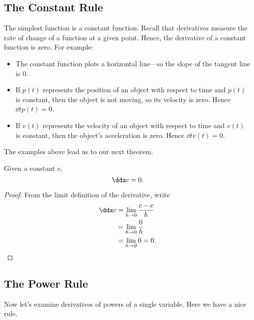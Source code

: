 \subsection*{The Constant Rule}

The simplest function is a constant function.  Recall that derivatives
measure the rate of change of a function at a given point. Hence, the
derivative of a constant function is zero. For example:
\begin{itemize}
\item The constant function plots a horizontal line---so the slope of
  the tangent line is $0$.
\item If $p(t)$ represents the position of an object with respect to
  time and $p(t)$ is constant, then the object is not moving, so its
  velocity is zero. Hence $\dd{t} p(t) = 0$.
\item If $v(t)$ represents the velocity of an object with respect to
  time and $v(t)$ is constant, then the object's acceleration is
  zero. Hence $\dd{t} v(t) = 0$.
\end{itemize}
The examples above lead us to our next theorem.


\begin{mainTheorem}
Given a constant $c$,
\[
\ddx c = 0.
\]
\end{mainTheorem}

\begin{proof}
From the limit definition of the derivative, write
\begin{align*}
\ddx c &= \lim_{h\to 0}\frac{c-c}{h}\\
&= \lim_{h\to 0} \frac{0}{h}\\
&= \lim_{h\to 0} 0 = 0.
\end{align*}
\end{proof}


\subsection*{The Power Rule}

Now let's examine derivatives of powers of a single variable.  Here we
have a nice rule.

